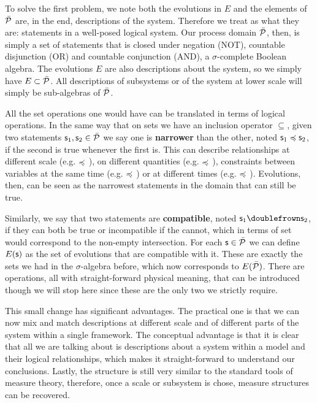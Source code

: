 \documentclass[letterpaper]{article}
\begin{document}
To solve the first problem, we note both the evolutions in $E$ and the elements of $\tdomain[P]$ are, in the end, descriptions of the system. Therefore we treat as what they are: statements in a well-posed logical system. Our process domain $\tdomain[P]$, then, is simply a set of statements that is closed under negation (NOT), countable disjunction (OR) and countable conjunction (AND), a $\sigma$-complete Boolean algebra. The evolutions $E$ are also descriptions about the system, so we simply have $E \subset \tdomain[P]$. All descriptions of subsystems or of the system at lower scale will simply be sub-algebras of $\tdomain[P]$. 

All the set operations one would have can be translated in terms of logical operations. In the same way that on sets we have an inclusion operator $\subseteq$, given two statements $\stmt_1, \stmt_2 \in \tdomain[P]$ we say one is \textbf{narrower} than the other, noted $\stmt_1 \narrower \stmt_2$, if the second is true whenever the first is. This can describe relationships at different scale (e.g.  $\narrower$ ), on different quantities (e.g.  $\narrower$ ), constraints between variables at the same time (e.g.  $\narrower$ ) or at different times (e.g.  $\narrower$ ). Evolutions, then, can be seen as the narrowest statements in the domain that can still be true.

Similarly, we say that two statements are \textbf{compatible}, noted $\stmt_1 \comp \stmt_2$, if they can both be true or incompatible if the cannot, which in terms of set would correspond to the non-empty intersection. For each $\stmt \in \tdomain[P]$ we can define $E(\stmt)$ as the set of evolutions that are compatible with it. These are exactly the sets we had in the $\sigma$-algebra before, which now corresponds to $E(\tdomain[P])$. There are operations, all with straight-forward physical meaning, that can be introduced though we will stop here since these are the only two we strictly require.

This small change has significant advantages. The practical one is that we can now mix and match descriptions at different scale and of different parts of the system within a single framework. The conceptual advantage is that it is clear that all we are talking about is descriptions about a system within a model and their logical relationships, which makes it straight-forward to understand our conclusions. Lastly, the structure is still very similar to the standard tools of measure theory, therefore, once a scale or subsystem is chose, measure structures can be recovered.
\end{document}
